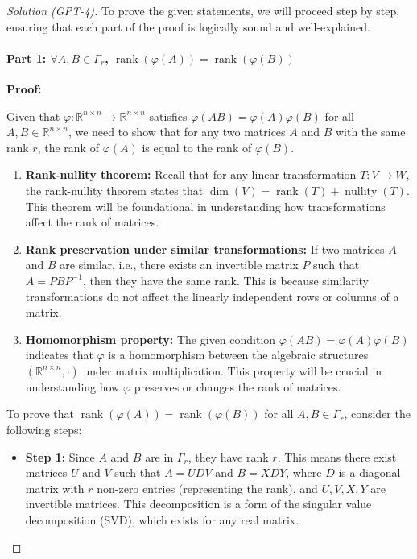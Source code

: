 \documentclass[11pt]{article}
\numberwithin{equation}{section}
\begin{document}
\begin{proof}[Solution (GPT-4)]
    To prove the given statements, we will proceed step by step, ensuring that each part of the proof is logically sound and well-explained.

\paragraph{Part 1: $ \forall A,B \in \Gamma_r$, $\operatorname{rank}(\varphi(A))= \operatorname{rank}(\varphi(B))$}

\textbf{Proof:}

Given that $\varphi:\mathbb{R}^{n\times n}\to\mathbb{R}^{n\times n}$ satisfies $\varphi(AB)=\varphi(A)\varphi(B)$ for all $A,B\in\mathbb{R}^{n\times n}$, we need to show that for any two matrices $A$ and $B$ with the same rank $r$, the rank of $\varphi(A)$ is equal to the rank of $\varphi(B)$.

\begin{enumerate}
  \item \textbf{Rank-nullity theorem:} Recall that for any linear transformation $T: V \to W$, the rank-nullity theorem states that $\dim(V) = \operatorname{rank}(T) + \operatorname{nullity}(T)$. This theorem will be foundational in understanding how transformations affect the rank of matrices.
  
  \item \textbf{Rank preservation under similar transformations:} If two matrices $A$ and $B$ are similar, i.e., there exists an invertible matrix $P$ such that $A = PBP^{-1}$, then they have the same rank. This is because similarity transformations do not affect the linearly independent rows or columns of a matrix.
  
  \item \textbf{Homomorphism property:} The given condition $\varphi(AB)=\varphi(A)\varphi(B)$ indicates that $\varphi$ is a homomorphism between the algebraic structures $(\mathbb{R}^{n\times n}, \cdot)$ under matrix multiplication. This property will be crucial in understanding how $\varphi$ preserves or changes the rank of matrices.
\end{enumerate}

To prove that $\operatorname{rank}(\varphi(A))= \operatorname{rank}(\varphi(B))$ for all $A,B\in\Gamma_r$, consider the following steps:

\begin{itemize}
  \item \textbf{Step 1:} Since $A$ and $B$ are in $\Gamma_r$, they have rank $r$. This means there exist matrices $U$ and $V$ such that $A = UDV$ and $B = XDY$, where $D$ is a diagonal matrix with $r$ non-zero entries (representing the rank), and $U, V, X, Y$ are invertible matrices. This decomposition is a form of the singular value decomposition (SVD), which exists for any real matrix.
  

\end{itemize}
\end{proof}
\end{document}
